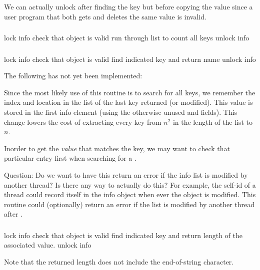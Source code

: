 \documentclass{article}
\begin{document}
We can actually unlock after finding the key but before copying the
value since a user program that both gets and deletes the same value
is invalid.

\subsubsection{}
\begin{algorithm}
lock info
check that object is valid
run through list to count all keys
unlock info
\end{algorithm}

\subsubsection{}
\begin{algorithm}
lock info
check that object is valid
find indicated key and return name
unlock info
\end{algorithm}

The following has not yet been implemented:

Since the most likely use of this routine is to search for all keys,
we remember the index and location in the list of the last key
returned (or modified).  This value is stored in the 
first info element (using the otherwise unused  and
 fields).  This change lowers the cost of extracting every 
key from $n^2$ in the length of the list to $n$.  

Inorder to get the
\emph{value} that matches the key, we may want to check that
particular entry first when searching for a .


Question:  Do we want to have this return an error if the info list is 
modified by another thread?  Is there any way to actually do this?  For
example, the self-id of a thread could record itself in the info object when
ever the object is modified.  This routine could (optionally) return an error
if the list is modified by another thread after .

\subsubsection{}
\begin{algorithm}
lock info
check that object is valid
find indicated key and return length of the associated value.
unlock info
\end{algorithm}
Note that the returned length does not include the end-of-string character.
\end{document}
